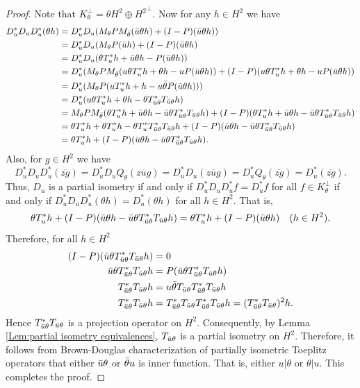 \documentclass[12pt]{amsart}
\theoremstyle{definition}
\theoremstyle{plain}
\theoremstyle{definition}
\numberwithin{equation}{section}
\begin{document}
\begin{proof}
Note that $K_{\theta}^{\perp} = \theta H^2 \oplus {H^{2}}^{\perp}$. Now for any $h \in H^2$
we have
\begin{align*}
D_u^*D_uD_u^*(\theta h) &= D_u^*D_u(M_\theta P M_{\Bar{\theta}}(\Bar{u}\theta h)+(I-P)(\Bar{u}\theta h))\\
			&= D_u^*D_u(M_{\theta} P(\Bar{u}h) + (I-P)(\Bar{u}\theta h)\\
			&= D_u^*D_u(\theta T_{u}^*h+\Bar{u}\theta h-P(\Bar{u}\theta h))\\
			&= D_u^*(M_{\theta} PM_{\Bar{\theta}}(u\theta T_{u}^*h+\theta h-uP(\Bar{u}\theta h))+(I-P)(u\theta T_{u}^*h+\theta h-uP(\Bar{u}\theta h))\\
			&= D_u^*(M_{\theta} P(uT_{u}^*h+h-u\Bar{\theta}P(\Bar{u}\theta h)))\\
			&= D_u^*(u\theta T_{u}^*h+\theta h-\theta T_{\Bar{u}\theta}^*T_{\Bar{u}\theta}h)\\
			&= M_{\theta}PM_{\Bar{\theta}}(\theta T_{u}^*h+\Bar{u}\theta h-\Bar{u}\theta T_{\Bar{u}\theta}^*T_{\Bar{u}\theta}h)+(I-P)(\theta T_{u}^*h+\Bar{u}\theta h-\Bar{u}\theta T_{\Bar{u}\theta}^*T_{\Bar{u}\theta}h)\\
			&= \theta T_{u}^*h+\theta T_{u}^{*}h-\theta T_{u}^*T_{\Bar{u}\theta}^*T_{\Bar{u}\theta}h + (I-P)(\Bar{u}\theta h-\Bar{u}\theta T_{\Bar{u}\theta}^*T_{\Bar{u}\theta}h)\\
			&= \theta T_{u}^*h+(I-P)(\Bar{u}\theta h-\Bar{u}\theta T_{\Bar{u}\theta}^*T_{\Bar{u}\theta}h).
\end{align*}
Also, for $g\in H^2$ we have 
\[
D_u^*D_uD_u^*(\overline{zg})=D_u^*D_uQ_{\theta}(\overline{zug})=D_u^*D_u(\overline{zug})=D_u^*Q_{\theta}(\overline{zg})=D_u^*(\overline{zg}).
\]
Thus, $D_u$ is a partial isometry if and only if $D_u^*D_uD_u^*f=D_u^*f$ for all $f\in K_{\theta}^{\perp}$ if and only if $D_u^*D_uD_u^*(\theta h)=D_u^*(\theta h)$ for all $h \in H^2$. 
That is,
\[
\theta T_{u}^*h+(I-P)(\Bar{u}\theta h-\Bar{u}\theta T_{\Bar{u}\theta}^*T_{\Bar{u}\theta}h)=\theta T_{u}^*h+(I-P)(\Bar{u}\theta h) \quad (h \in H^2).
\]
Therefore, for all $h\in H^2$
\begin{align*}
(I-P)(\Bar{u}\theta T_{\Bar{u}\theta}^*T_{\Bar{u}\theta}h) &=0\\
			\Bar{u}\theta T_{\Bar{u}\theta}^*T_{\Bar{u}\theta}h&=P(\Bar{u}\theta T_{\Bar{u}\theta}^*T_{\Bar{u}\theta}h)\\
			T_{\Bar{u}\theta}^*T_{\Bar{u}\theta}h &= u\Bar{\theta}T_{\Bar{u}\theta} T_{\Bar{u}\theta}^*T_{\Bar{u}\theta}h\\
			T_{\Bar{u}\theta}^*T_{\Bar{u}\theta}h &= T_{\Bar{u}\theta}^*T_{\Bar{u}\theta}T_{\Bar{u}\theta}^*T_{\Bar{u}\theta}h=(T_{\Bar{u}\theta}^*T_{\Bar{u}\theta})^2h.
\end{align*}
Hence $T_{\Bar{u}\theta}^*T_{\Bar{u}\theta}$ is a projection operator on $H^2$. Consequently, by Lemma \ref{Lem:partial isometry equivalences}, $T_{\Bar{u}\theta}$ is a partial isometry on  $H^2$. Therefore, it follows from Brown-Douglas \cite{Brown_Douglas} characterization of partially isometric Toeplitz operators that either $\Bar{u}\theta$ or $\Bar{\theta}u$ is inner function. That is, either $u | \theta$ or $\theta | u$.
This completes the proof.
\end{proof}
	
\end{document}
